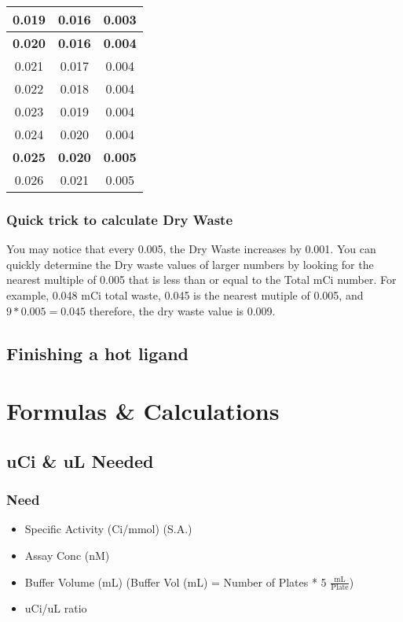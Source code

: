 \documentclass[12pt, letterpaper]{article}
\begin{document}
\begin{table}[ht]
\begin{tabular}{|c|c|c|}
    0.019              & 0.016               & 0.003              \\ \hline
    \textbf{0.020}     & \textbf{0.016}      & \textbf{0.004}     \\ \hline
    0.021              & 0.017               & 0.004              \\ \hline
    0.022              & 0.018               & 0.004              \\ \hline
    0.023              & 0.019               & 0.004              \\ \hline
    0.024              & 0.020               & 0.004              \\ \hline
    \textbf{0.025}     & \textbf{0.020}      & \textbf{0.005}     \\ \hline
    0.026              & 0.021               & 0.005              \\ \hline
    \end{tabular}
\end{table}

\FloatBarrier

\subsubsection{Quick trick to calculate Dry Waste}
You may notice that every 0.005, the Dry Waste increases by 0.001. You can quickly determine the Dry waste values of larger numbers by looking for the nearest multiple of 0.005 that is less than or equal to the Total mCi number. For example, 0.048 mCi total waste, 0.045 is the nearest mutiple of 0.005, and $ 9 * 0.005 = 0.045 $ therefore, the dry waste value is 0.009.

\subsection{Finishing a hot ligand}


\section{Formulas \& Calculations}
\subsection{uCi \& uL Needed}
\subsubsection{Need}
\begin{itemize}
    \item Specific Activity (Ci/mmol) (S.A.)
    \item Assay Conc (nM)
    \item Buffer Volume (mL) (Buffer Vol (mL) = Number of Plates * 5 $\frac{\text{mL}}{\text{Plate}}$)
    \item uCi/uL ratio
\end{itemize}
\end{document}
